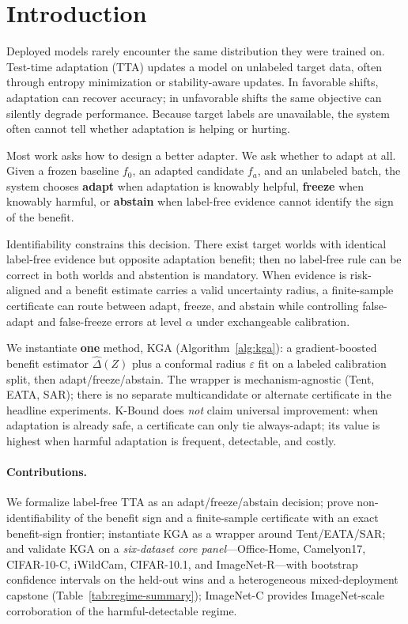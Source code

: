 \documentclass[conference]{IEEEtran}
\theoremstyle{plain}
\theoremstyle{definition}
\theoremstyle{remark}
\begin{document}
\section{Introduction}\label{sec:intro}
Deployed models rarely encounter the same distribution they were trained on.
Test-time adaptation (TTA) updates a model on unlabeled target data, often through
entropy minimization or stability-aware updates. In favorable shifts, adaptation can
recover accuracy; in unfavorable shifts the same objective can silently degrade
performance. Because target labels are unavailable, the system often cannot tell
whether adaptation is helping or hurting.

Most work asks how to design a better adapter. We ask whether to adapt at all.
Given a frozen baseline $f_0$, an adapted candidate $f_a$, and an unlabeled batch,
the system chooses \textbf{adapt} when adaptation is knowably helpful, \textbf{freeze}
when knowably harmful, or \textbf{abstain} when label-free evidence cannot identify
the sign of the benefit.

Identifiability constrains this decision. There exist target worlds with identical
label-free evidence but opposite adaptation benefit; then no label-free rule can be
correct in both worlds and abstention is mandatory. When evidence is risk-aligned and
a benefit estimate carries a valid uncertainty radius, a finite-sample certificate can
route between adapt, freeze, and abstain while controlling false-adapt and false-freeze
errors at level $\alpha$ under exchangeable calibration.

We instantiate \textbf{one} method, \textsc{KGA} (Algorithm~\ref{alg:kga}): a gradient-boosted
benefit estimator $\widehat\Delta(Z)$ plus a conformal radius $\varepsilon$ fit on a labeled
calibration split, then adapt/freeze/abstain. The wrapper is mechanism-agnostic (Tent, EATA, SAR);
there is no separate multicandidate or alternate certificate in the headline experiments.
K-Bound does \emph{not} claim universal improvement: when adaptation is already safe,
a certificate can only tie always-adapt; its value is highest when harmful adaptation
is frequent, detectable, and costly.

\paragraph{Contributions.}
We formalize label-free TTA as an adapt/freeze/abstain decision; prove non-identifiability
of the benefit sign and a finite-sample certificate with an exact benefit-sign frontier;
instantiate \textsc{KGA} as a wrapper around Tent/EATA/SAR; and validate \textsc{KGA} on a
\emph{six-dataset core panel}---Office-Home, Camelyon17, CIFAR-10-C, iWildCam, CIFAR-10.1, and
ImageNet-R---with bootstrap confidence intervals on the held-out wins and a heterogeneous
mixed-deployment capstone (Table~\ref{tab:regime-summary}); ImageNet-C provides ImageNet-scale
corroboration of the harmful-detectable regime.
\end{document}
